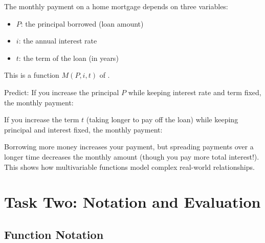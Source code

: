 \documentclass{ximera}
\begin{document}
\begin{problem}
The monthly payment on a home mortgage depends on three variables:
\begin{itemize}
    \item $P$: the principal borrowed (loan amount)
    \item $i$: the annual interest rate
    \item $t$: the term of the loan (in years)
\end{itemize}

This is a function $M(P, i, t)$ of .

Predict: If you increase the principal $P$ while keeping interest rate and term fixed, the monthly payment:
\begin{multipleChoice}
\end{multipleChoice}

If you increase the term $t$ (taking longer to pay off the loan) while keeping principal and interest fixed, the monthly payment:
\begin{multipleChoice}
\end{multipleChoice}

\begin{feedback}
Borrowing more money increases your payment, but spreading payments over a longer time decreases the monthly amount (though you pay more total interest!). This shows how multivariable functions model complex real-world relationships.
\end{feedback}
\end{problem}

\section*{Task Two: Notation and Evaluation}

\subsection*{Function Notation}
\end{document}
